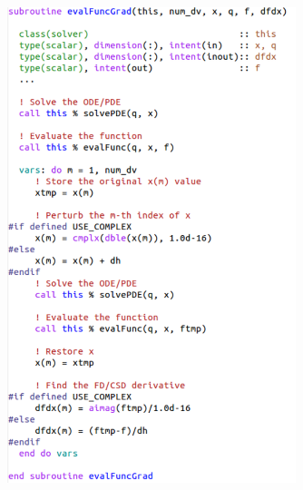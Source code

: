 \documentclass{beamer}
\begin{document}
\begin{frame}[fragile]
\begin{minipage}{\linewidth}
\begin{minipage}{0.6\linewidth}
\begin{figure}
      \includegraphics[trim={2pt 0 0 0}, clip,width=0.75\textwidth]{fd-csd.pdf}
    \end{figure}
    \end{minipage}
  \end{minipage}
\end{frame}
\end{document}
